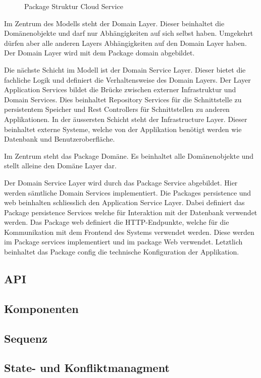 \begin{figure}[h]
    \centering
    \begin{minipage}[b]{0.9\textwidth}
        \caption{Package Struktur Cloud Service}\label{fig:packagescloudservice}
    \end{minipage}
\end{figure}


Im Zentrum des Modells steht der Domain Layer.
Dieser beinhaltet die Domänenobjekte und darf nur Abhängigkeiten auf sich selbst haben.
Umgekehrt dürfen aber alle anderen Layers Abhängigkeiten auf den Domain Layer haben.
Der Domain Layer wird mit dem Package domain abgebildet.

Die nächste Schicht im Modell ist der Domain Service Layer.
Dieser bietet die fachliche Logik und definiert die Verhaltensweise des Domain Layers.
Der Layer Application Services bildet die Brücke zwischen externer Infrastruktur und Domain Services.
Dies beinhaltet Repository Services für die Schnittstelle zu persistentem Speicher und Rest Controllers für Schnittstellen zu anderen Applikationen.
In der äussersten Schicht steht der Infrastructure Layer.
Dieser beinhaltet externe Systeme, welche von der Applikation benötigt werden wie Datenbank und Benutzeroberfläche.






Im Zentrum steht das Package Domäne.
Es beinhaltet alle Domänenobjekte und stellt alleine den Domäne Layer dar.

Der Domain Service Layer wird durch das Package Service abgebildet.
Hier werden sämtliche Domain Services implementiert.
Die Packages persistence und web beinhalten schliesslich den Application Service Layer.
Dabei definiert das Package persistence Services welche für Interaktion mit der Datenbank verwendet werden.
Das Package web definiert die HTTP-Endpunkte, welche für die Kommunikation mit dem Frontend des Systems verwendet werden.
Diese werden im Package services implementiert und im package Web verwendet.
Letztlich beinhaltet das Package config die technische Konfiguration der Applikation.




\subsection{API}

\subsection{Komponenten}

\subsection{Sequenz}

\subsection{State- und Konfliktmanagment}
